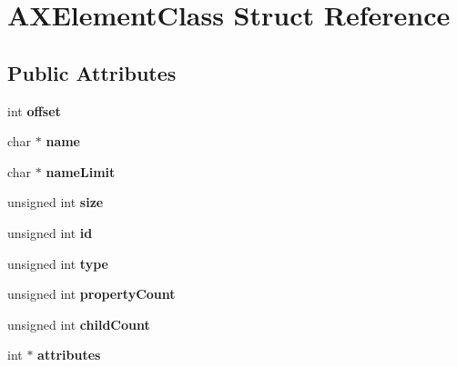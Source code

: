 \hypertarget{structAXElementClass}{\section{A\-X\-Element\-Class Struct Reference}
\label{structAXElementClass}
}
\subsection*{Public Attributes}
\begin{DoxyCompactItemize}
\item 
\hypertarget{structAXElementClass_acafe59d9f78550654bab13e4cba98af9}{int {\bfseries offset}}\label{structAXElementClass_acafe59d9f78550654bab13e4cba98af9}

\item 
\hypertarget{structAXElementClass_a4147dedb64be87074a963bf00ac9e6f3}{char $\ast$ {\bfseries name}}\label{structAXElementClass_a4147dedb64be87074a963bf00ac9e6f3}

\item 
\hypertarget{structAXElementClass_a75a4c612376eb51b45a32c024fd03ec7}{char $\ast$ {\bfseries name\-Limit}}\label{structAXElementClass_a75a4c612376eb51b45a32c024fd03ec7}

\item 
\hypertarget{structAXElementClass_a899de6b2aae092be9037a2da0996fa34}{unsigned int {\bfseries size}}\label{structAXElementClass_a899de6b2aae092be9037a2da0996fa34}

\item 
\hypertarget{structAXElementClass_a90d9eb5da228d4631a367cd2bc0fcb99}{unsigned int {\bfseries id}}\label{structAXElementClass_a90d9eb5da228d4631a367cd2bc0fcb99}

\item 
\hypertarget{structAXElementClass_a37dc7992352e9d03bd341971dc594516}{unsigned int {\bfseries type}}\label{structAXElementClass_a37dc7992352e9d03bd341971dc594516}

\item 
\hypertarget{structAXElementClass_a2c9af8e3d1d62044475304dd5bb4351b}{unsigned int {\bfseries property\-Count}}\label{structAXElementClass_a2c9af8e3d1d62044475304dd5bb4351b}

\item 
\hypertarget{structAXElementClass_a4695df8520d22cf99e7291d24bd6204e}{unsigned int {\bfseries child\-Count}}\label{structAXElementClass_a4695df8520d22cf99e7291d24bd6204e}

\item 
\hypertarget{structAXElementClass_a9b4491af77f23ee17f7e38cec034b6b3}{int $\ast$ {\bfseries attributes}}\label{structAXElementClass_a9b4491af77f23ee17f7e38cec034b6b3}


\end{DoxyCompactItemize}
